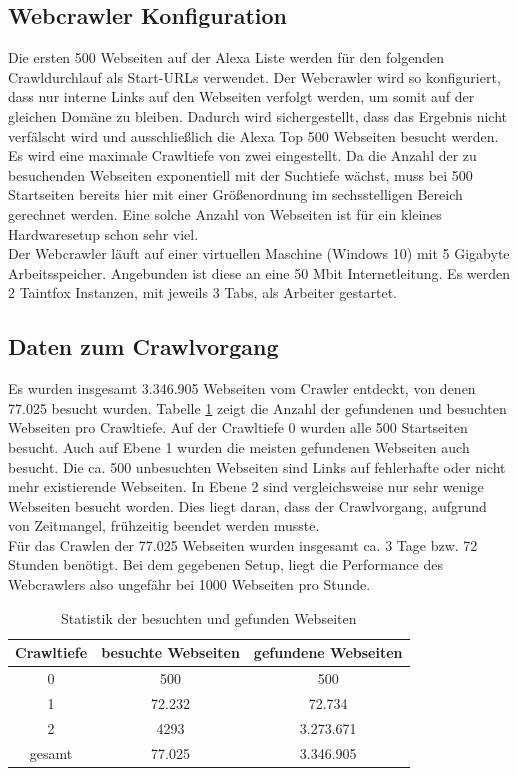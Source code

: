 \subsection{Webcrawler Konfiguration}
Die ersten 500 Webseiten auf der Alexa Liste werden für den folgenden Crawldurchlauf als Start-URLs verwendet. Der Webcrawler wird so konfiguriert, dass nur interne Links auf den Webseiten verfolgt werden, um somit auf der gleichen Domäne zu bleiben. Dadurch wird sichergestellt, dass das Ergebnis nicht verfälscht wird und ausschließlich die Alexa Top 500 Webseiten besucht werden. \\
Es wird eine maximale Crawltiefe von zwei eingestellt. Da die Anzahl der zu besuchenden Webseiten exponentiell mit der Suchtiefe wächst, muss bei 500 Startseiten bereits hier mit einer Größenordnung im sechsstelligen Bereich gerechnet werden. Eine solche Anzahl von Webseiten ist für ein kleines Hardwaresetup schon sehr viel.\\
Der Webcrawler läuft auf einer virtuellen Maschine (Windows 10) mit 5 Gigabyte Arbeitsspeicher. Angebunden ist diese an eine 50 Mbit Internetleitung. Es werden 2 Taintfox Instanzen, mit jeweils 3 Tabs, als Arbeiter gestartet.
\subsection{Daten zum Crawlvorgang}
Es wurden insgesamt 3.346.905 Webseiten vom Crawler entdeckt, von denen 77.025 besucht wurden. Tabelle \ref{tab:StatistikBesuchteSeiten} zeigt die Anzahl der gefundenen und besuchten Webseiten pro Crawltiefe. Auf der Crawltiefe 0 wurden alle 500 Startseiten besucht. Auch auf Ebene 1 wurden die meisten gefundenen Webseiten auch besucht. Die ca. 500 unbesuchten Webseiten sind Links auf fehlerhafte oder nicht mehr existierende Webseiten. In Ebene 2 sind vergleichsweise nur sehr wenige Webseiten besucht worden. Dies liegt daran, dass der Crawlvorgang, aufgrund von Zeitmangel, frühzeitig beendet werden musste. \\
Für das Crawlen der 77.025 Webseiten wurden insgesamt ca. 3 Tage bzw. 72 Stunden benötigt. Bei dem gegebenen Setup, liegt die Performance des Webcrawlers also ungefähr bei 1000 Webseiten pro Stunde.

\begin{table}[H]
\centering
\begin{tabular}{|c|c|c|}
	\hline 
	Crawltiefe & besuchte Webseiten & gefundene Webseiten \\ 
	\hline 
	0 & 500 & 500 \\ 
	\hline 
	1 & 72.232 & 72.734 \\ 
	\hline 
	2 & 4293 & 3.273.671 \\ 
	\hline 
	\hline
	gesamt  & 77.025 & 3.346.905 \\ 
	\hline 
\end{tabular} 
\caption{Statistik der besuchten und gefunden Webseiten}
\label{tab:StatistikBesuchteSeiten}
\end{table}

